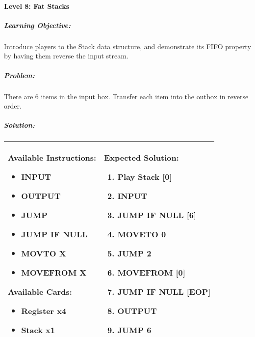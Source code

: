 \paragraph{Level 8: Fat Stacks}
\subparagraph{Learning Objective:} Introduce players to the Stack data structure, 
and demonstrate its FIFO property by having them reverse the input stream.

\subparagraph{Problem:} There are 6 items in the input box. Transfer each item into 
the outbox in reverse order.

\newpage
\subparagraph{Solution:} 
\begin{center}
    \begin{tabular}{ | m{5cm} | m{9cm} | } 
        \hline
            \textbf{Available Instructions:} 
            \begin{itemize}
                \setlength\itemsep{-.35em}
                \item INPUT
                \item OUTPUT
                \item JUMP
                \item JUMP IF NULL
                \item MOVTO X
                \item MOVEFROM X
            \end{itemize}
            \textbf{Available Cards:} 
            \begin{itemize}
                \setlength\itemsep{-.35em}
                \item Register x4
                \item Stack x1
            \end{itemize}& 
            \textbf{Expected Solution:} 
            \begin{enumerate}
                \setlength\itemsep{-.35em}
                \item Play Stack [0]
                \item INPUT
                \item JUMP IF NULL [6]
                \item MOVETO 0
                \item JUMP 2
                \item MOVEFROM [0]
                \item JUMP IF NULL [EOP]
                \item OUTPUT
                \item JUMP 6
            \end{enumerate}
            \\
        \hline
    \end{tabular}
\end{center}

